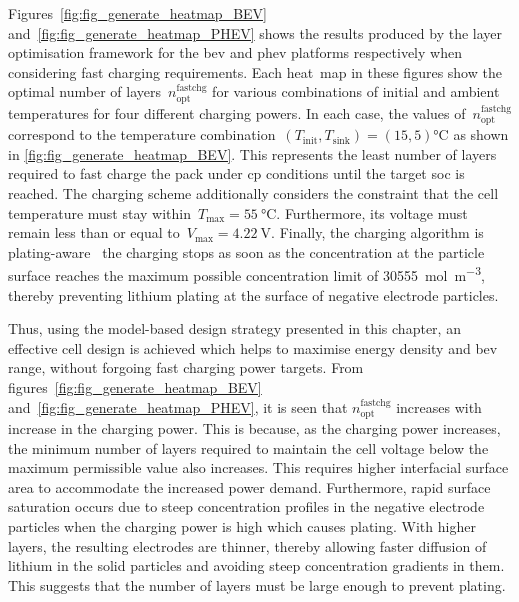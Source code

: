 Figures~\ref{fig:fig_generate_heatmap_BEV}
and~\ref{fig:fig_generate_heatmap_PHEV} shows the results  produced by the layer
optimisation framework  for the \gls{bev} and  \gls{phev} platforms respectively
when  considering fast  charging requirements.  Each heat~map  in these  figures
show  the optimal  number  of  layers~$n^\text{fastchg}_\text{opt}$ for  various
combinations of  initial and  ambient temperatures  for four  different charging
powers. In each case, the  values of~$n^\text{fastchg}_\text{opt}$ correspond to
the  temperature  combination~${(T_\text{init},T_\text{sink})  =  (15,  5)
\si{\degreeCelsius}}$  as  shown  in  \cref{fig:fig_generate_heatmap_BEV}.  This
represents the  least number of  layers required to  fast charge the  pack under
\gls{cp} conditions until  the target \gls{soc} is reached.  The charging scheme
additionally considers the constraint that the cell temperature must stay
within~${T_\text{max}=  \SI{55}{\degreeCelsius}}$. Furthermore,  its voltage
must remain less than or equal  to~${V_\text{max} = \SI{4.22}{\volt}}$. Finally,
the charging algorithm is plating-aware \ie~the charging stops as soon as the
concentration at the particle surface reaches the maximum possible concentration
limit of \SI{30555}{\mol\per\meter\cubed}, thereby preventing  lithium plating
at the surface  of negative electrode particles.


Thus,   using    the   model-based    design   strategy   presented    in   this
chapter,   an   effective    cell   design   is   achieved    which   helps   to
maximise   energy   density  and   \gls{bev}   range,   without  forgoing   fast
charging   power    targets.   From   figures~\ref{fig:fig_generate_heatmap_BEV}
and~\ref{fig:fig_generate_heatmap_PHEV},       it       is       seen       that
$n^\text{fastchg}_\text{opt}$  increases with  increase in  the charging  power.
This is because,  as the charging power increases, the  minimum number of layers
required to maintain  the cell voltage below the maximum  permissible value also
increases.  This requires  higher interfacial  surface area  to accommodate  the
increased  power demand.  Furthermore, rapid  surface saturation  occurs due  to
steep  concentration  profiles in  the  negative  electrode particles  when  the
charging power is  high which causes plating. With higher  layers, the resulting
electrodes  are thinner,  thereby allowing  faster diffusion  of lithium  in the
solid  particles  and  avoiding  steep concentration  gradients  in  them.  This
suggests that the number of layers must be large enough to prevent plating.

